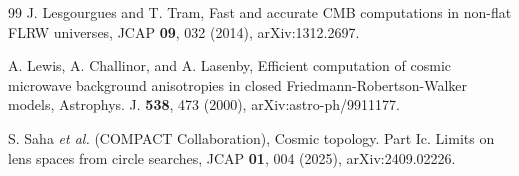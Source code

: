 \documentclass[
  aps,
  prd,
  reprint,
  superscriptaddress,
  nofootinbib,
  floatfix,
  longbibliography
]{revtex4-2}
\begin{document}
\begin{thebibliography}{99}
J. Lesgourgues and T. Tram, Fast and accurate CMB computations in non-flat FLRW universes, JCAP \textbf{09}, 032 (2014), arXiv:1312.2697.

A. Lewis, A. Challinor, and A. Lasenby, Efficient computation of cosmic microwave background anisotropies in closed Friedmann-Robertson-Walker models, Astrophys. J. \textbf{538}, 473 (2000), arXiv:astro-ph/9911177.

S. Saha \textit{et al.} (COMPACT Collaboration), Cosmic topology. Part Ic. Limits on lens spaces from circle searches, JCAP \textbf{01}, 004 (2025), arXiv:2409.02226.

\end{thebibliography}
\end{document}

